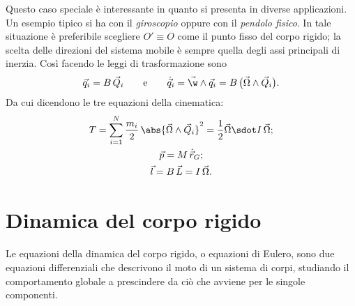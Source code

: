 \begin{ese}
	Questo caso speciale è interessante in quanto si presenta in diverse applicazioni.
	Un esempio tipico si ha con il \emph{giroscopio} oppure con il \emph{pendolo fisico}.
	In tale situazione è preferibile scegliere \(O'\equiv O\) come il punto fisso del corpo rigido; la scelta delle direzioni del sistema mobile è sempre quella degli assi principali di inerzia.
	Così facendo le leggi di trasformazione sono
	\[
		\vec{q}_i = B\,\vec{Q}_i \qquad\text{e}\qquad \dot{\vec{q}}_i = \vec{\w} \wedge \vec{q}_i = B\,\big(\vec{\Omega} \wedge \vec{Q}_i\big).
	\]
	Da cui dicendono le tre equazioni della cinematica:
	\begin{gather*}
		T = \sum_{i=1}^N \frac{m_i}{2}\,\abs{\vec{\Omega}\wedge \vec{Q}_i}^2 = \frac{1}{2}\vec{\Omega} \sdot I\,\vec{\Omega};\\
		\vec{p} = M\,\dot{\vec{r}}_G;\\
		\vec{l} = B\,\vec{L} = I\,\vec{\Omega}.
	\end{gather*}
\end{ese}

\section{Dinamica del corpo rigido}

Le equazioni della dinamica del corpo rigido, o equazioni di Eulero, sono due equazioni differenziali che descrivono il moto di un sistema di corpi, studiando il comportamento globale a prescindere da ciò che avviene per le singole componenti.

